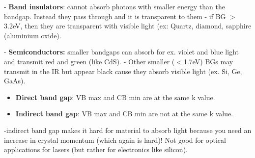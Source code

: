 - \textbf{Band insulators}: cannot absorb photons with smaller energy than the bandgap. Instead they pass through and it is transparent to them
- if BG $>$ 3.2eV, then they are transparent with visible light (ex: Quartz, diamond, sapphire (aluminium oxide).

- \textbf{Semiconductors:} smaller bandgaps can absorb for ex. violet and blue light and transmit red and green (like CdS). 
- Other smaller ($<$1.7eV) BGs may transmit in the IR but appear black cause they absorb visible light (ex. Si, Ge, GaAs).

\begin{itemize}
    \item \textbf{Direct band gap}: VB max and CB min are at the same k value.
    \item \textbf{Indirect band gap}: VB max and CB min are not at the same k value.
\end{itemize}

-indirect band gap makes it hard for material to absorb light because you need an increase in crystal momentum (which again is hard)! Not good for optical applications for lasers (but rather for electronics like silicon).
